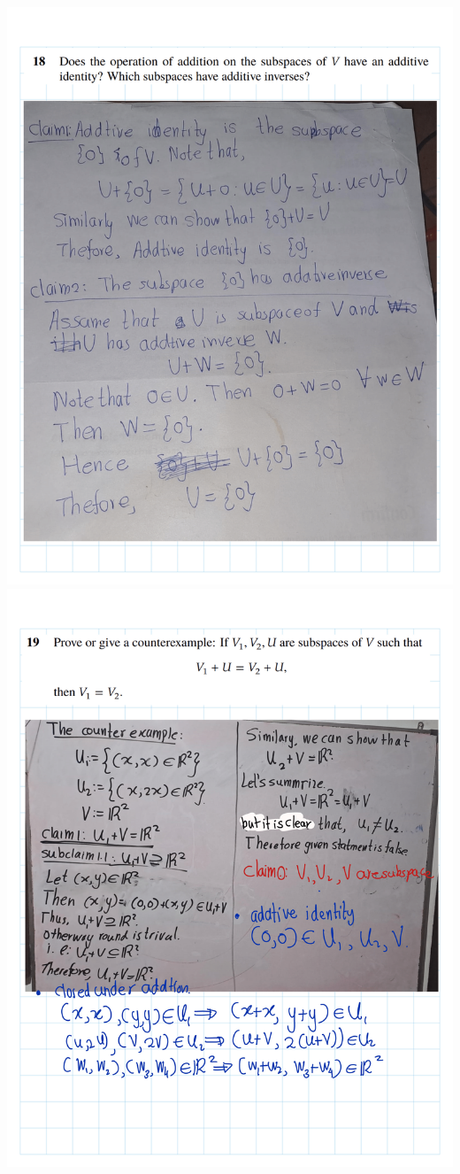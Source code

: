 \documentclass[
]{book}
\theoremstyle{definition}
\theoremstyle{definition}
\theoremstyle{definition}
\theoremstyle{definition}
\theoremstyle{remark}
\begin{document}
\begin{enumerate}
  \includegraphics{fig/Ex1C/Ex/Ex-20.png}
  \includegraphics{fig/Ex1C/Ex/Ex-21.png}

\end{enumerate}
\end{document}
